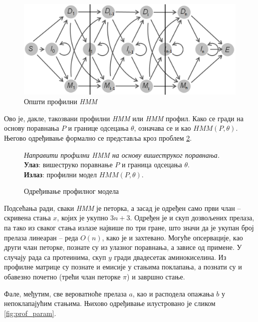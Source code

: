 \documentclass[12pt,oneside]{memoir}
\newenvironment{problem}[1][!ht]
{\renewcommand{\algorithmcfname}{Проблем}
\begin{figure}[!ht]
\centering
  \begin{minipage}{.94\linewidth}
	\begin{algorithm}[#1]%
  }{\end{algorithm}
  \end{minipage}
\end{figure}}
\begin{document}
\begin{CJK}{UTF8}{ipxm}
\begin{figure}[H]
  \centering
  \includegraphics[width=.95\textwidth]{prof_hmm.png}
  \caption{Општи профилни \textit{HMM}\cite{compeau2015}}
  \label{fig:prof_hmm}
\end{figure}

Ово је, дакле, такозвани профилни \textit{HMM} или \textit{HMM} профил. Како се гради на основу поравнања $P$ и границе одсецања $\theta$, означава се и као $HMM(P, \theta)$. Његово одређивање формално се представља кроз проблем \ref{prob:prof}.

\begin{problem}[H]
  \SetAlgoLined
  \textit{Направити профилни \textit{HMM} на основу вишеструког поравнања.}\\
  \textbf{Улаз}: вишеструко поравнање $P$ и граница одсецања $\theta$.\\
  \textbf{Излаз}: профилни модел $HMM(P, \theta)$.
  \caption{Одређивање профилног модела\cite{ba10e}}
  \label{prob:prof}
\end{problem}

Подсећања ради, сваки \textit{HMM} је петорка, а засад је одређен само први члан -- скривена стања $x$, којих је укупно $3n+3$. Одређен је и скуп дозвољених прелаза, па тако из сваког стања излазе највише по три гране, што значи да је укупан број прелаза линеаран -- реда $O(n)$, како је и захтевано. Могуће опсервације, као други члан петорке, познате су из улазног поравнања, а зависе од примене. У случају рада са протеинима, скуп $y$ гради двадесетак аминокиселина. Из профилне матрице су познате и емисије у стањима поклапања, а познати су и обавезно почетно (трећи члан петорке $\pi$) и завршно стање.

Фале, међутим, све вероватноће прелаза $a$, као и расподела опажања $b$ у непоклапајућим стањима. Њихово одређивање илустровано је сликом \ref{fig:prof_param}.


\end{CJK}
\end{document}
